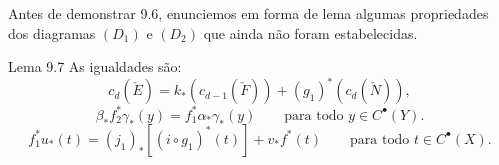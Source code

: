 Antes de demonstrar 9.6, enunciemos em forma de lema algumas propriedades dos diagramas $(D_1)$ e $(D_2)$ que ainda não foram estabelecidas.

\begin{statement}{Lema 9.7}
As igualdades são:
\[
c_d(\check E)=k_*(c_{d-1}(\check F))+(g_1)^*(c_d(\check N)),
\tag{i}
\]
\[
\beta_*f_2^*\gamma_*(y)=f_1^*\alpha_*\gamma_*(y)\qquad\text{para todo }y\in C^{\bullet}(Y).
\tag{ii}
\]
\[
f_1^*u_*(t)=(j_1)_*[(i\circ g_1)^*(t)]+v_*f^*(t)\qquad\text{para todo }t\in C^{\bullet}(X).
\tag{iii}
\]
\end{statement}
